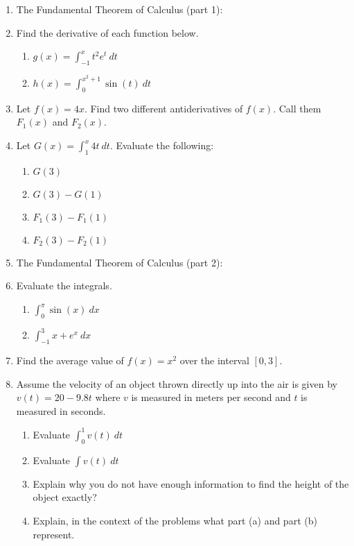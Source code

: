 \documentclass[11pt,fleqn]{article}
\renewcommand{\d}{\displaystyle}
\begin{document}
\vspace*{-0.7in}

\begin{center}
  \Large{}
  \end{center}
\begin{enumerate}
\item The Fundamental Theorem of Calculus (part 1):
\vfill
\item Find the derivative of each function below.
	\begin{multicols}{2}
	\begin{enumerate}
	\item $\d g(x)=\int_{-1}^x t^2e^t\: dt$
	\item $\d h(x)=\int_0^{x^2+1} \sin(t) \: dt$
	\end{enumerate}
	\end{multicols}
\vfill
\item Let $f(x)=4x.$ Find two different antiderivatives of $f(x)$. Call them $F_1(x)$ and $F_2(x).$
\vfill
\item Let $G(x)= \int_1^x 4t \: dt.$ Evaluate the following:\\
	\begin{enumerate}
	\item $G(3)$
	\vfill
	\item $G(3)-G(1)$
	\vfill
	\item $F_1(3)-F_1(1)$
	\vfill
	\item $F_2(3)-F_2(1)$
	\vfill
	\end{enumerate}
\newpage
\item The Fundamental Theorem of Calculus (part 2):
\vfill
\item Evaluate the integrals.
	\begin{multicols}{2}
	\begin{enumerate}
	\item $\d \int_0^{\pi} \sin (x) \: dx$
	\item $\d \int_{-1}^3 x+e^x \: dx$
	\end{enumerate}
	\end{multicols}
\vfill
\item Find the average value of $f(x)=x^2$ over the interval $[0,3].$
\vfill
\item Assume the velocity of an object thrown directly up into the air is given by $v(t)= 20-9.8t$ where $v$ is measured in meters per second and $t$ is measured in seconds. 
	\begin{enumerate}
	\item Evaluate $\int_0^1 v(t) \: dt$
	\vfill
	\item Evaluate $\int v(t) \: dt$
	\vfill
	\item Explain why you do not have enough information to find the height of the object exactly?
	\vfill
	\item Explain, in the context of the problems what part (a) and part (b) represent.
	\vfill
	\end{enumerate}

\end{enumerate}
\end{document}
